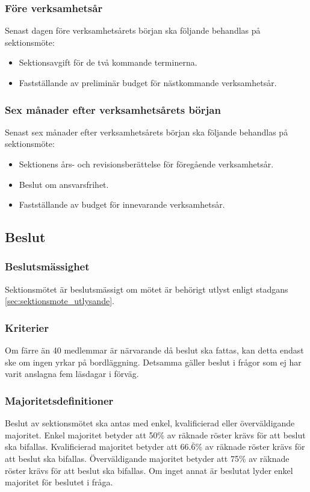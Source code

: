 \documentclass[a4paper]{dtek}
\begin{document}
\subsubsection{Före verksamhetsår}
Senast dagen före verksamhetsårets början ska följande behandlas på sektionsmöte:
\begin{itemize}
\item Sektionsavgift för de två kommande terminerna.
\item Fastställande av preliminär budget för nästkommande verksamhetsår.
\end{itemize}
\subsubsection{Sex månader efter verksamhetsårets början}
Senast sex månader efter verksamhetsårets början ska följande behandlas på sektionsmöte:
\begin{itemize}
\item Sektionens års- och revisionsberättelse för föregående verksamhetsår.
\item Beslut om ansvarsfrihet.
\item Fastställande av budget för innevarande verksamhetsår.
\end{itemize}
\subsection{Beslut}
\subsubsection{Beslutsmässighet}
Sektionsmötet är beslutsmässigt om mötet är behörigt utlyst enligt stadgans \ref{sec:sektionsmote_utlysande}.
\subsubsection{Kriterier}
Om färre än 40 medlemmar är närvarande då beslut ska fattas, kan detta endast ske om ingen yrkar på bordläggning. Detsamma gäller beslut i frågor som ej har varit anslagna fem läsdagar i förväg.
\subsubsection{Majoritetsdefinitioner}
Beslut av sektionsmötet ska antas med enkel, kvalificierad eller överväldigande majoritet.
Enkel majoritet betyder att 50\% av räknade röster krävs för att beslut ska bifallas.
Kvalificierad majoritet betyder att $66.\bar{6}$\% av räknade röster krävs för att beslut ska bifallas.
Överväldigande majoritet betyder att 75\% av räknade röster krävs för att beslut ska bifallas.
Om inget annat är beslutat lyder enkel majoritet för beslutet i fråga.
\end{document}
